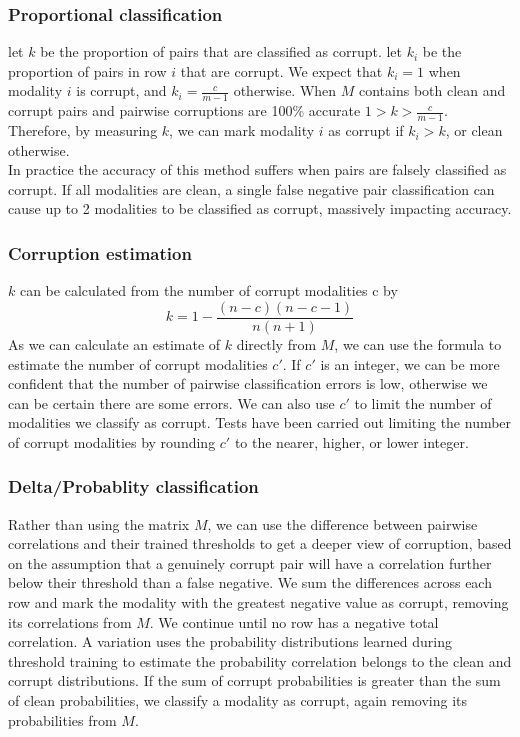 \subsubsection{Proportional classification}
let $k$ be the proportion of pairs that are classified as corrupt. let $k_i$ be the proportion of pairs in row $i$ that are corrupt. We expect that $k_i = 1$ when modality $i$ is corrupt, and $k_i = \frac{c}{m-1}$ otherwise. When $M$ contains both clean and corrupt pairs and pairwise corruptions are 100\% accurate $1>k>\frac{c}{m-1}$. Therefore, by measuring $k$, we can mark modality $i$ as corrupt if $k_i > k$, or clean otherwise.\\
In practice the accuracy of this method suffers when pairs are falsely classified as corrupt. If all modalities are clean, a single false negative pair classification can cause up to 2 modalities to be classified as corrupt, massively impacting accuracy.

\subsubsection{Corruption estimation}
$k$ can be calculated from the number of corrupt modalities c by 
$$
k = 1-\frac{(n-c)(n-c-1)}{n(n+1)}
$$
As we can calculate an estimate of $k$ directly from $M$, we can use the formula to estimate the number of corrupt modalities $c'$. If $c'$ is an integer, we can be more confident that the number of pairwise classification errors is low, otherwise we can be certain there are some errors. We can also use $c'$ to limit the number of modalities we classify as corrupt. Tests have been carried out limiting the number of corrupt modalities by rounding $c'$ to the nearer, higher, or lower integer.

\subsubsection{Delta/Probablity classification}
Rather than using the matrix $M$, we can use the difference between pairwise correlations and their trained thresholds to get a deeper view of corruption, based on the assumption that a genuinely corrupt pair will have a correlation further below their threshold than a false negative. We sum the differences across each row and mark the modality with the greatest negative value as corrupt, removing its correlations from $M$. We continue until no row has a negative total correlation. A variation uses the probability distributions learned during threshold training to estimate the probability correlation belongs to the clean and corrupt distributions. If the sum of corrupt probabilities is greater than the sum of clean probabilities, we classify a modality as corrupt, again removing its probabilities from $M$.

